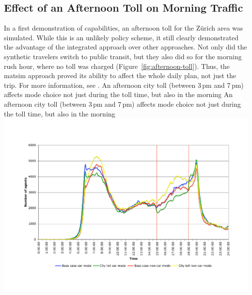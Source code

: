 \subsection{Effect of an Afternoon Toll on Morning Traffic}
In a first demonstration of capabilities, an afternoon toll for the Zürich area was simulated. While this is an unlikely policy scheme, it still clearly demonstrated the advantage of the integrated approach over other approaches. Not only did the synthetic travelers switch to public transit, but they also did so for the morning rush hour, where no toll was charged (Figure~\ref{fig:afternoon-toll}). Thus, the \gls{matsim} approach proved its ability to affect the whole daily plan, not just the trip. For more information, see \citet{RieserEtAl2008ITMEveningToll}.
%
\createfigure%
{An afternoon city toll (between 3\,pm and 7\,pm) affects mode choice not just during the toll time, but also in the morning}%
{An afternoon city toll (between 3\,pm and 7\,pm) affects mode choice not just during the toll time, but also in the morning}%
{\label{fig:afternoon-toll}}%
{\includegraphics[width=0.99\hsize,trim=2cm 2.5cm 2cm 3cm,clip]{extending/figures/roadpricing/583vs585onRoute.pdf}}%
{}

